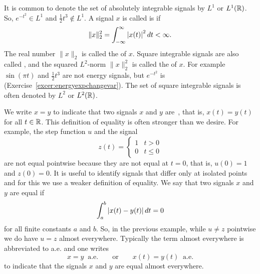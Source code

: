 It is common to denote the set of absolutely integrable signals by $L^1$ or $L^1({\mathbb R})$.  So, $e^{-t^2} \in L^1$ and $\tfrac{1}{2}t^3 \notin L^1$.   A signal $x$ is called is  if
\[
\|x\|_2^2 = \int_{-\infty}^{\infty} \left\vert x(t) \right\vert^2 dt < \infty.
\]
The real number $\|x\|_2$ is called the  of $x$.  Square integrable signals are also called , and the squared $L^2$-norm $\|x\|_2^2$ is called the  of $x$. For example $\sin( \pi t)$ and $\tfrac{1}{2}t^3$ are not energy signals, but $e^{-t^2}$ is (Exercise~\ref{excer:energyexpchangevar}).  The set of square integrable signals is often denoted by $L^2$ or $L^2({\mathbb R})$.  %

We write $x = y$ to indicate that two signals $x$ and $y$ are~, that is, $x(t) = y(t)$ for all $t \in {\mathbb R}$.  This definition of equality is often stronger than we desire.  For example, the step function $u$ and the signal
\[
z(t) = \begin{cases}
1 & t > 0 \\
0 & t \leq 0
\end{cases}
\]
are not equal pointwise because they are not equal at $t=0$, that is, $u(0) = 1$ and $z(0) = 0$. %
It is useful to identify signals that differ only at isolated points and for this we use a weaker definition of equality.  We say that two signals $x$ and $y$ are equal  if
\[
\int_{a}^b \left\vert  x(t) - y(t)  \right\vert dt = 0
\]
for all finite constants $a$ and $b$.  So, in the previous example, while $u \neq z$ pointwise we do have $u = z$ almost everywhere.  Typically the term almost everywhere is abbreviated to a.e. and one writes 
\[
x = y \;\; \text{a.e.} \qquad \text{or} \qquad x(t) = y(t) \;\; \text{a.e.}
\] 
to indicate that the signals $x$ and $y$ are equal almost everywhere.  %

